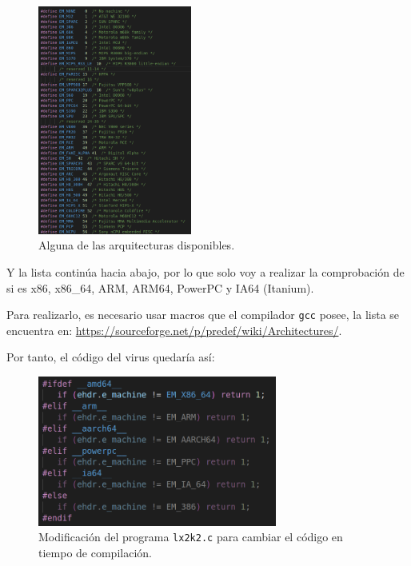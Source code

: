 \documentclass{article}
\begin{document}
\begin{figure}[H]
    \centering
    \includegraphics[width=0.45\textwidth]{imagenes/Captura desde 2022-11-23 13-07-09.png}
    \caption{Alguna de las arquitecturas disponibles.}
\end{figure}

Y la lista continúa hacia abajo, por lo que solo voy a realizar la comprobación de si es x86, x86\_64, ARM, ARM64, PowerPC y IA64 (Itanium). 

\newpage

Para realizarlo, es necesario usar macros que el compilador \verb|gcc| posee, la lista se encuentra en: \url{https://sourceforge.net/p/predef/wiki/Architectures/}.

\bigskip

Por tanto, el código del virus quedaría así:

\begin{figure}[H]
    \centering
    \includegraphics[width=0.7\textwidth]{imagenes/Captura desde 2022-11-25 17-21-11.png}
    \caption{Modificación del programa \texttt{lx2k2.c} para cambiar el código en tiempo de compilación.}
\end{figure}
\end{document}
